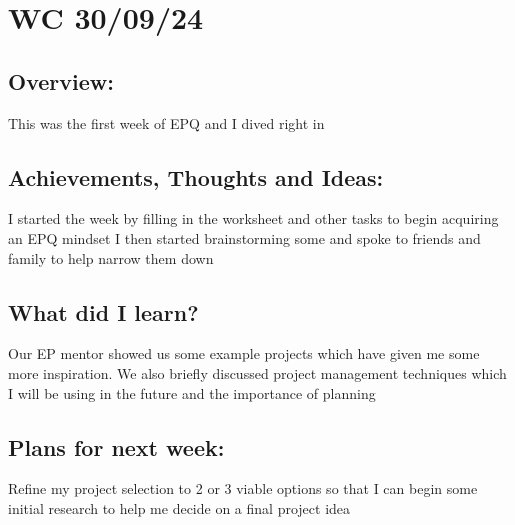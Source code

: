 \section{WC 30/09/24}

\subsection*{Overview:}
This was the first week of EPQ and I dived right in

\subsection*{Achievements, Thoughts and Ideas:}
I started the week by filling in the  worksheet and other tasks to begin acquiring an EPQ mindset
I then started brainstorming some  and spoke to friends and family to help narrow them down 

\subsection*{What did I learn?}
Our EP mentor showed us some example projects which have given me some more inspiration. We also briefly discussed project management techniques which I will be using in the future and the importance of planning

\subsection*{Plans for next week:}
Refine my project selection to 2 or 3 viable options so that I can begin some initial research to help me decide on a final project idea
